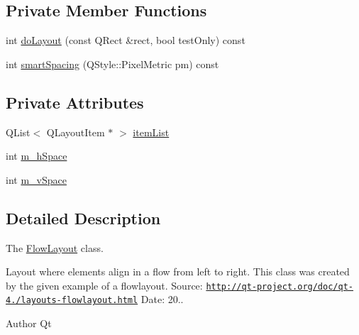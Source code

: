 \subsection*{Private Member Functions}
\begin{DoxyCompactItemize}
\item 
int \hyperlink{class_flow_layout_a2a2a9fba22a112465ac0ae090aeca28d}{do\+Layout} (const Q\+Rect \&rect, bool test\+Only) const 
\item 
int \hyperlink{class_flow_layout_a5587a685db946a053451293d7493a523}{smart\+Spacing} (Q\+Style\+::\+Pixel\+Metric pm) const 
\end{DoxyCompactItemize}
\subsection*{Private Attributes}
\begin{DoxyCompactItemize}
\item 
Q\+List$<$ Q\+Layout\+Item $\ast$ $>$ \hyperlink{class_flow_layout_ac0439e82402e53445451edfece8a499d}{item\+List}
\item 
int \hyperlink{class_flow_layout_a4ca5e85c50060f2cf19d88d1e3bf9cd5}{m\+\_\+h\+Space}
\item 
int \hyperlink{class_flow_layout_ab24b23dbcc261472940b3755ba63a4c0}{m\+\_\+v\+Space}
\end{DoxyCompactItemize}


\subsection{Detailed Description}
The \hyperlink{class_flow_layout}{Flow\+Layout} class. 

Layout where elements align in a flow from left to right. This class was created by the given example of a flowlayout. Source\+: \href{http://qt-project.org/doc/qt-4.8/layouts-flowlayout.html}{\tt http\+://qt-\/project.\+org/doc/qt-\/4./layouts-\/flowlayout.\+html} Date\+: 20..

\begin{DoxyAuthor}{Author}
Qt 
\end{DoxyAuthor}


